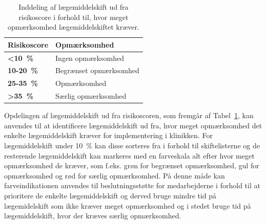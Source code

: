 \vspace{0.5cm}
\begin{table}[H]
\caption{Inddeling af lægemiddelskift ud fra risikoscore i forhold til, hvor meget opmærksomhed lægemiddelskiftet kræver.}
\vspace{2mm}
\label{table:cutoff} 
\centering
\begin{tabular}{|l|l|} \hline
\rowcolor[HTML]{C0C0C0}\textbf{Risikoscore} & \textbf{ Opmærksomhed} \\ \hline
\cellcolor[HTML]{C0C0C0} \textbf{<10~\%} & Ingen opmærksomhed \\ \hline
\cellcolor[HTML]{C0C0C0}\textbf{10-20~\%} & Begrænset opmærksomhed \\ \hline
\cellcolor[HTML]{C0C0C0}\textbf{25-35~\% }& Opmærksomhed  \\ \hline
\cellcolor[HTML]{C0C0C0}\textbf{>35~\%} & Særlig opmærksomhed \\ \hline
\end{tabular}
\end{table}

Opdelingen af lægemiddelskift ud fra risikoscoren, som fremgår af Tabel~\ref{table:cutoff}, kan anvendes til at identificere lægemiddelskift ud fra, hvor meget opmærksomhed det enkelte lægemiddelskift kræver for implementering i klinikken. For lægemiddelskift under 10~\% kan disse sorteres fra i forhold til skiftelisterne og de resterende lægemiddelskift kan markeres med en farveskala alt efter hvor meget opmærksomhed de kræver, som f.eks. grøn for begrænset opmærksomhed, gul for opmærksomhed og rød for særlig opmærksomhed. På denne måde  kan farveindikationen anvendes til beslutningsstøtte for medarbejderne i forhold til at prioritere de enkelte lægemiddelskift og derved bruge mindre tid på lægemidelskift som ikke kræver meget opmærksomhed og i stedet bruge tid på lægemiddelskift, hvor der kræves særlig opmærksomhed.

